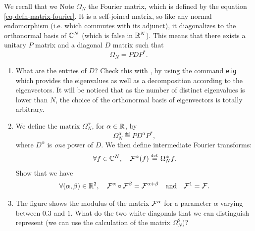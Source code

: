  
\begin{exo}
\label{exo-transforme-partial-fourier}
 
      We recall that we Note $ \Omega_N $ the Fourier matrix, which is defined by the equation \eqref{eq-defn-matrix-fourier}. It is a self-joined matrix, so like any normal endomorphism (i.e. which commutes with its adjunct), it diagonalizes to the orthonormal basis of $ \mathbb{C}^N $ (which is false in $ \mathbb{R}^N $). This means that there exists a unitary $ P $ matrix and a diagonal $ D $ matrix such that
\begin{equation*}
\Omega_N = PDP^{*}.
\end{equation*}
\begin{enumerate}
\item What are the entries of $ D $? Check this with \Matlab{}, by using the command \texttt{eig} which provides the eigenvalues as well as a decomposition according to the eigenvectors. It will be noticed that as the number of distinct eigenvalues is lower than $N$, the choice of the orthonormal basis of eigenvectors is totally arbitrary.
\item We define the matrix $ \Omega_N^{\alpha} $, for $ \alpha \in \mathbb{R} $, by
\begin{equation*}
\Omega_N^{\alpha} \eqdef PD^{\alpha} P^{*},
\end{equation*}
where $ D^{\alpha} $ is \textit{one} power  of $ D $. We then define intermediate Fourier transforms:
\begin{equation*}
\forall f \in \mathbb{C}^N, \quad \mathcal{F}^{\alpha} (f) \stackrel{\mbox{\upshape\tiny def.}}{=} \Omega_N^{\alpha} f.
\end{equation*}
Show that we have
\begin{equation*}
\forall (\alpha, \beta) \in \mathbb{R}^2, \quad \mathcal{F}^{\alpha} \circ \mathcal{F}^{\beta} = \mathcal{F}^{\alpha + \beta} \quad \text{and} \quad \mathcal{F}^1 = \mathcal{F}.
\end{equation*}
 
\item The figure  shows the modulus of the matrix $ \mathcal{F}^{\alpha} $ for a parameter $ \alpha $ varying between $ 0.3 $ and $ 1 $. What do the two white diagonals that we can distinguish represent (we can use the calculation of the matrix $ \Omega_N^2 $)? 


\end{enumerate}
\end{exo}
